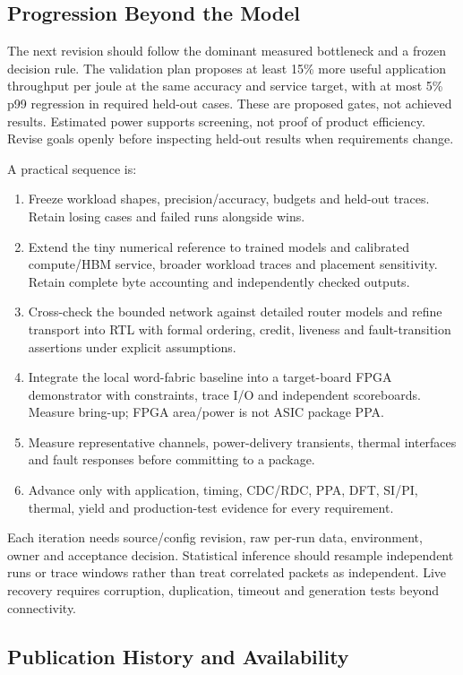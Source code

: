 \documentclass[11pt,a4paper]{article}
\begin{document}
\subsection{Progression Beyond the Model}

The next revision should follow the dominant measured bottleneck and a
frozen decision rule. The validation plan proposes at least 15\% more useful
application throughput per joule at the same accuracy and service target,
with at most 5\% p99 regression in required held-out cases. These are
proposed gates, not achieved results. Estimated power supports screening,
not proof of product efficiency. Revise goals openly before inspecting
held-out results when requirements change.

A practical sequence is:
\begin{enumerate}
\item Freeze workload shapes, precision/accuracy, budgets and held-out
traces. Retain losing cases and failed runs alongside wins.
\item Extend the tiny numerical reference to trained models and calibrated
compute/HBM service, broader workload traces and placement sensitivity.
Retain complete byte accounting and independently checked outputs.
\item Cross-check the bounded network against detailed router models and
refine transport into RTL with formal ordering, credit, liveness and
fault-transition assertions under explicit assumptions.
\item Integrate the local word-fabric baseline into a target-board FPGA
demonstrator with constraints, trace I/O and independent scoreboards.
Measure bring-up; FPGA area/power is not ASIC package PPA.
\item Measure representative channels, power-delivery transients, thermal
interfaces and fault responses before committing to a package.
\item Advance only with application, timing, CDC/RDC, PPA, DFT, SI/PI,
thermal, yield and production-test evidence for every requirement.
\end{enumerate}

Each iteration needs source/config revision, raw per-run data, environment,
owner and acceptance decision. Statistical inference should resample
independent runs or trace windows rather than treat correlated packets as
independent. Live recovery requires corruption, duplication, timeout and
generation tests beyond connectivity.

\subsection{Publication History and Availability}
\end{document}
